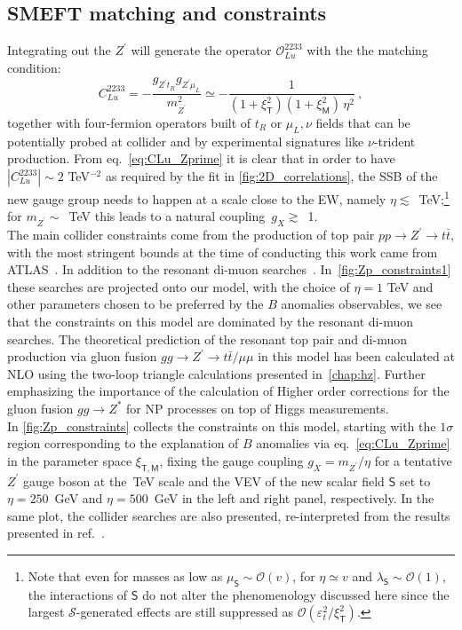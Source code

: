 \subsection{SMEFT matching and constraints}
Integrating out the $Z^{\prime}$ will generate the operator $\mathcal O_{L u}^{2233}$ with the the matching condition:
\begin{equation}
	\label{eq:CLu_Zprime}
	C_{L u}^{2233} = - \frac{g_{Z^{\prime} t_{R} } g_{Z^{\prime} \mu_{L}} }{m_{Z^{\prime}}^2} \simeq - \frac{1}{(1+ \xi^2_{\mathsf{T}})(1+ \xi^2_{\mathsf{M}}) \, \eta^{2}} \ ,
\end{equation}
%
together with four-fermion operators built of $t_{R}$ or $\mu_{L},\nu$  fields that can be potentially probed at collider and by experimental signatures like $\nu$-trident production. 
From eq.~\eqref{eq:CLu_Zprime} it is clear that in order to have $|C_{L u}^{2233}| \sim 2 $ TeV$^{-2}$ as required  by the fit in \autoref{fig:2D_correlations}, the SSB of the new gauge group needs to happen at a scale close to the EW, namely $\eta \lesssim$~TeV;\footnote{Note that even for masses as low as $\mu_{\mathsf{S}} \sim \mathcal{O}(v)$, for $\eta \simeq v$ and $\lambda_{\mathsf{S}} \sim \mathcal{O}(1)$, the interactions of $\mathsf{S}$ do not alter the phenomenology discussed here since the largest $\mathcal{S}$-generated effects are still suppressed as $\mathcal{O}(\varepsilon_{t}^2/\xi^2_{\mathsf{T}})$.} for $m_{Z^{\prime}} \sim$~TeV this leads to a natural coupling~$g_{X} \gtrsim$~1. \\ The main collider constraints come from the production of top pair $ pp \to Z^\prime \to t \bar t$, with the most stringent bounds at the time of conducting this work came from ATLAS~\cite{ATLAS:2019npw}. In addition to the resonant di-muon searches~\cite{ATLAS-CONF-2019-001}. In~\autoref{fig:Zp_constraints1} these searches are projected onto our model, with the choice of $\eta=1$ TeV and other parameters chosen to be preferred by the $B$ anomalies observables, we see that the constraints on this model are dominated by the resonant di-muon searches. The theoretical prediction of the resonant top pair and di-muon production via gluon fusion $ gg \to Z^\prime \to t \bar t /\mu \mu$ in this model has been calculated at NLO using the two-loop triangle calculations presented in~\autoref{chap:hz}. Further emphasizing the importance of the calculation of Higher order corrections for the gluon fusion $ gg \to Z^*$ for NP processes on top of Higgs measurements. \\
In \autoref{fig:Zp_constraints} collects the constraints on this model, starting with the $1\sigma$ region corresponding to the explanation of $B$ anomalies via eq.~\eqref{eq:CLu_Zprime} in the parameter space $\xi_{\mathsf{T,M}}$, fixing the gauge coupling $g_{X} = m_{Z^{\prime}}/\eta$ for a tentative $Z^{\prime}$ gauge boson at the~TeV scale and the VEV of the new scalar field $\mathsf{S}$ set to $\eta = 250$~GeV and $\eta = 500$~GeV  in the left and right panel, respectively. In the same plot, the collider searches are also presented, re-interpreted from the results presented in ref.~\cite{Camargo-Molina:2018cwu}. 
